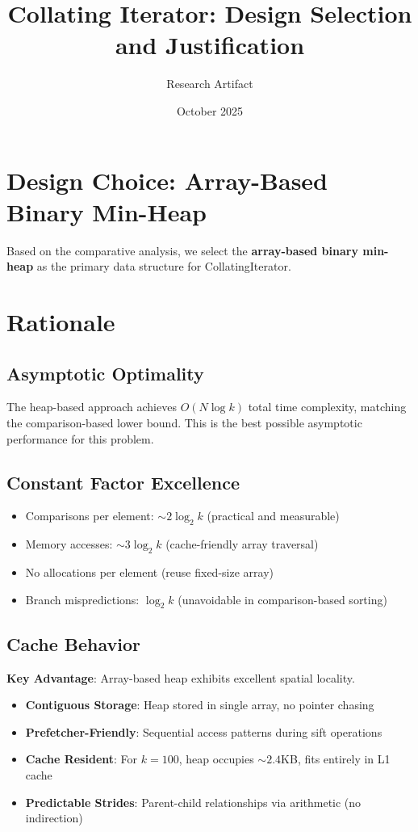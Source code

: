 \documentclass[11pt]{article}
\title{Collating Iterator: Design Selection and Justification}
\author{Research Artifact}
\date{October 2025}
\begin{document}
\maketitle

\section{Design Choice: Array-Based Binary Min-Heap}

Based on the comparative analysis, we select the \textbf{array-based binary min-heap} as the primary data structure for CollatingIterator.

\section{Rationale}

\subsection{Asymptotic Optimality}

The heap-based approach achieves $O(N \log k)$ total time complexity, matching the comparison-based lower bound. This is the best possible asymptotic performance for this problem.

\subsection{Constant Factor Excellence}

\begin{itemize}
    \item Comparisons per element: $\sim 2 \log_2 k$ (practical and measurable)
    \item Memory accesses: $\sim 3 \log_2 k$ (cache-friendly array traversal)
    \item No allocations per element (reuse fixed-size array)
    \item Branch mispredictions: $\log_2 k$ (unavoidable in comparison-based sorting)
\end{itemize}

\subsection{Cache Behavior}

\textbf{Key Advantage}: Array-based heap exhibits excellent spatial locality.

\begin{itemize}
    \item \textbf{Contiguous Storage}: Heap stored in single array, no pointer chasing
    \item \textbf{Prefetcher-Friendly}: Sequential access patterns during sift operations
    \item \textbf{Cache Resident}: For $k = 100$, heap occupies $\sim 2.4$KB, fits entirely in L1 cache
    \item \textbf{Predictable Strides}: Parent-child relationships via arithmetic (no indirection)
\end{itemize}
\end{document}
